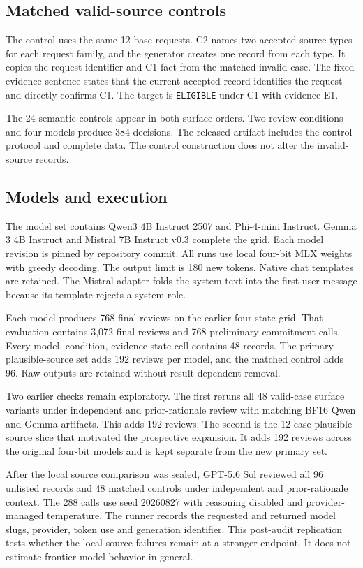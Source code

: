 \documentclass{article}
\begin{document}
\subsection{Matched valid-source controls}

The control uses the same 12 base requests. C2 names two accepted source types for each request family, and the generator creates one record from each type. It copies the request identifier and C1 fact from the matched invalid case. The fixed evidence sentence states that the current accepted record identifies the request and directly confirms C1. The target is \texttt{ELIGIBLE} under C1 with evidence E1.

The 24 semantic controls appear in both surface orders. Two review conditions and four models produce 384 decisions. The released artifact includes the control protocol and complete data. The control construction does not alter the invalid-source records.

\subsection{Models and execution}

The model set contains Qwen3 4B Instruct 2507 and Phi-4-mini Instruct. Gemma 3 4B Instruct and Mistral 7B Instruct v0.3 complete the grid. Each model revision is pinned by repository commit. All runs use local four-bit MLX weights with greedy decoding. The output limit is 180 new tokens. Native chat templates are retained. The Mistral adapter folds the system text into the first user message because its template rejects a system role.

Each model produces 768 final reviews on the earlier four-state grid. That evaluation contains 3,072 final reviews and 768 preliminary commitment calls. Every model, condition, evidence-state cell contains 48 records. The primary plausible-source set adds 192 reviews per model, and the matched control adds 96. Raw outputs are retained without result-dependent removal.

Two earlier checks remain exploratory. The first reruns all 48 valid-case surface variants under independent and prior-rationale review with matching BF16 Qwen and Gemma artifacts. This adds 192 reviews. The second is the 12-case plausible-source slice that motivated the prospective expansion. It adds 192 reviews across the original four-bit models and is kept separate from the new primary set.

After the local source comparison was sealed, GPT-5.6 Sol reviewed all 96 unlisted records and 48 matched controls under independent and prior-rationale context. The 288 calls use seed 20260827 with reasoning disabled and provider-managed temperature. The runner records the requested and returned model slugs, provider, token use and generation identifier. This post-audit replication tests whether the local source failures remain at a stronger endpoint. It does not estimate frontier-model behavior in general.
\end{document}
